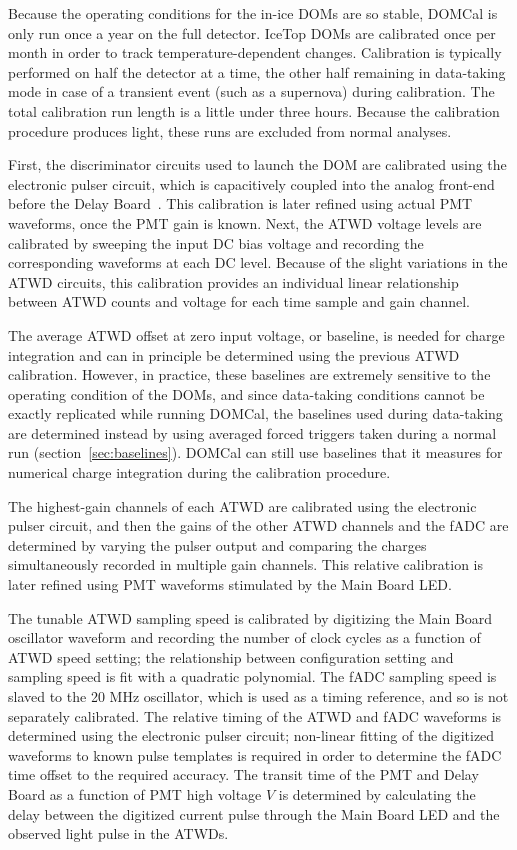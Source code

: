 Because the operating conditions for
the in-ice DOMs are so stable, DOMCal is only run once a year on the full
detector. IceTop DOMs are calibrated once per month in order to track
temperature-dependent changes.  Calibration is
typically performed on half the detector at a time, the other half
remaining in data-taking mode in case of a transient event (such as a
supernova) during calibration. The total calibration run length is a
little under three hours. Because the calibration procedure produces
light, these runs are excluded from normal analyses.

First, the discriminator circuits used to launch the DOM are calibrated
using the electronic pulser circuit, which is capacitively coupled into the
analog front-end before the Delay Board~\cite{ICECUBE:DAQ}.  This
calibration is later refined using actual 
PMT waveforms, once the PMT gain is known.  Next, the ATWD voltage levels
are calibrated by sweeping the input DC bias voltage and recording the
corresponding waveforms at each DC level.  Because of the slight variations in the ATWD circuits, this
calibration provides an individual linear relationship between ATWD counts
and voltage for each time sample and gain channel.

The average ATWD offset at zero input voltage, or baseline, is needed for
charge integration and can in principle be determined using the previous
ATWD calibration. However, in
practice, these baselines are extremely sensitive to the operating
condition of the DOMs, and since data-taking conditions cannot be exactly
replicated while running DOMCal, the baselines used during data-taking are
determined instead by using averaged forced triggers taken during a normal
run (section~\ref{sec:baselines}).  DOMCal can still use baselines that it measures
for numerical charge integration during the calibration procedure.

The highest-gain channels of each ATWD are calibrated using the electronic
pulser circuit, and then the gains of the other ATWD channels and the fADC
are determined by varying the pulser output and comparing the charges
simultaneously recorded in multiple gain channels.  This relative
calibration is later refined using PMT waveforms stimulated by the Main
Board LED.

The tunable ATWD sampling speed is calibrated by digitizing the Main Board oscillator
waveform and recording the number of clock cycles as a function of ATWD
speed setting; the relationship between configuration setting and sampling
speed is fit with a quadratic polynomial.  The fADC sampling speed is
slaved to the 20 MHz oscillator, which is used as a timing reference, and
so is not separately calibrated.  The relative timing of 
the ATWD and fADC waveforms is determined using the electronic pulser circuit;
non-linear fitting of the digitized waveforms to known pulse templates is
required in order to determine the fADC time offset to the required accuracy.
The transit time of the PMT and Delay Board as a function of PMT high
voltage $V$ is determined by calculating the delay between the digitized
current pulse through the Main Board LED and the observed light pulse in
the ATWDs.

